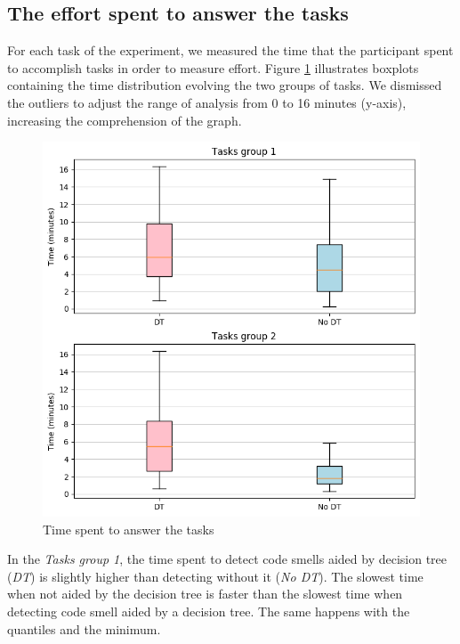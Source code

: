 \subsection{The effort spent to answer the tasks} \label{sec:effortSpentAnswerTasks}

For each task of the experiment, we measured the time that the participant spent to accomplish tasks in order to measure effort. Figure \ref{fig:timeSpentAnswerTasks} illustrates boxplots containing the time distribution evolving the two groups of tasks. We dismissed the outliers to adjust the range of analysis from 0 to 16 minutes (y-axis), increasing the comprehension of the graph. 

\begin{figure}[ht]
\centering
\includegraphics[width=13cm]{figures/graph_boxplot_time_required.png}
\caption{Time spent to answer the tasks}
\label{fig:timeSpentAnswerTasks}
\end{figure}

In the \textit{Tasks group 1}, the time spent to detect code smells aided by decision tree (\textit{DT}) is slightly higher than detecting without it (\textit{No DT}). The slowest time when not aided by the decision tree is faster than the slowest time when detecting code smell aided by a decision tree. The same happens with the quantiles and the minimum.

